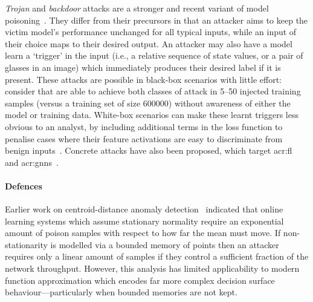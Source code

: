 \emph{Trojan} and \emph{backdoor} attacks are a stronger and recent variant of model poisoning~\parencite{DBLP:journals/corr/abs-1712-05526}.
They differ from their precursors in that an attacker aims to keep the victim model's performance unchanged for all typical inputs, while an input of their choice maps to their desired output.
An attacker may also have a model learn a `trigger' in the input (i.e., a relative sequence of state values, or a pair of glasses in an image) which immediately produces their desired label if it is present.
These attacks are possible in black-box scenarios with little effort: consider that \citeauthor{DBLP:journals/corr/abs-1712-05526} are able to achieve both classes of attack in \numrange{5}{50} injected training samples (versus a training set of size \num{600000}) without awareness of either the model or training data.
White-box scenarios can make these learnt triggers less obvious to an analyst, by including additional terms in the loss function to penalise cases where their feature activations are easy to discriminate from benign inputs~\parencite{DBLP:conf/eurosp/TanS20}.
Concrete attacks have also been proposed, which target \gls{acr:fl}~\parencite{DBLP:conf/aistats/BagdasaryanVHES20} and \glspl{acr:gnn}~\parencite{DBLP:conf/uss/XiPJ021}.


\paragraph{Defences}
Earlier work on centroid-distance anomaly detection~\parencite{DBLP:journals/jmlr/KloftL10} indicated that online learning systems which assume stationary normality require an exponential amount of poison samples with respect to how far the mean must move.
If non-stationarity is modelled via a bounded memory of points then an attacker requires only a linear amount of samples if they control a sufficient fraction of the network throughput.
However, this analysis has limited applicability to modern function approximation which encodes far more complex decision surface behaviour---particularly when bounded memories are not kept.

